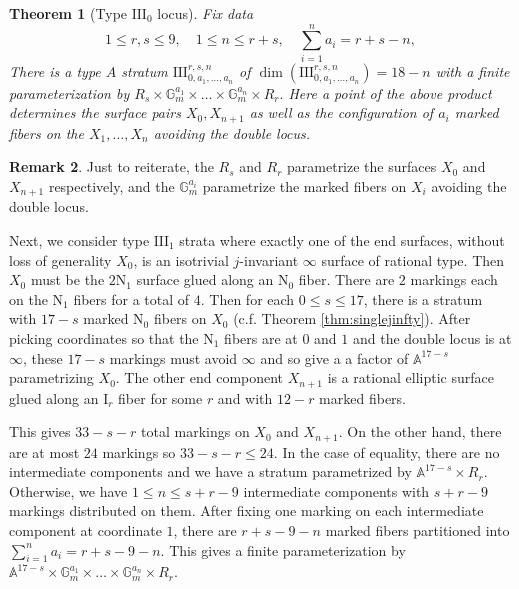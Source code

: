 \documentclass[11pt]{amsart}
\newtheorem{theorem}{Theorem}[section]
\theoremstyle{definition}
\newtheorem{remark}[theorem]{Remark}
\theoremstyle{remark}
\newcommand{\mb}[1]{\mathbb{#1}}
\begin{document}
	\begin{theorem}[Type $\mathrm{III}_0$ locus]\label{thm:type31} Fix data
		$$ 1 \le r,s \le 9, \quad 1 \le n  \le r + s, \quad \sum_{i = 1}^n a_i = r + s - n, $$
		There is a type $A$ stratum
		$
		\mathrm{III}^{r,s,n}_{0, a_1, \ldots, a_n} 
		$
		of  $\dim(\mathrm{III}^{r,s,n}_{0, a_1, \ldots, a_n}) = 18 - n$ with a finite parameterization by 
		$
		R_s \times \mb{G}_m^{a_1} \times \ldots \times \mb{G}_m^{a_n} \times R_r.
		$
		Here a point of the above product determines the surface pairs $X_0, X_{n +1}$ as well as the configuration of $a_i$ marked fibers on the $X_1, \ldots, X_n$ avoiding the double locus. \end{theorem}
	
	\begin{remark} Just to reiterate, the $R_s$ and $R_r$ parametrize the surfaces $X_0$ and $X_{n+1}$ respectively, and the $\mb{G}_m^{a_i}$ parametrize the marked fibers on $X_i$ avoiding the double locus. \end{remark}
	
	Next, we consider type $\mathrm{III}_1$ strata where exactly one of the end surfaces, without loss of generality $X_0$, is an isotrivial $j$-invariant $\infty$ surface of rational type. Then $X_0$ must be the $2\mathrm{N}_1$ surface glued along an $\mathrm{N}_0$ fiber. There are $2$ markings each on the $\mathrm{N}_1$ fibers for a total of $4$. Then for each $0 \le s \le 17$, there is a stratum with $17 - s$ marked $\mathrm{N}_0$ fibers on $X_0$ (c.f. Theorem \ref{thm:singlejinfty}). After picking coordinates so that the $\mathrm{N}_1$ fibers are at $0$ and $1$ and the double locus is at $\infty$, these $17-s$ markings must avoid $\infty$ and so give a a factor of $\mb{A}^{17-s}$ parametrizing $X_0$. The other end component $X_{n+1}$ is a rational elliptic surface glued along an $\mathrm{I}_r$ fiber for some $r$ and with $12-r$ marked fibers.
	
	This gives $33 - s - r$ total markings on $X_0$ and $X_{n+1}$. On the other hand, there are at most $24$ markings so
	$
	33 - s - r \le 24. 
	$
	In the case of equality, there are no intermediate components and we have a stratum parametrized by $\mb{A}^{17 - s} \times R_r$. Otherwise, we have 
	$
	1 \le n \le s + r - 9
	$
	intermediate components with $s + r - 9$ markings distributed on them. After fixing one marking on each intermediate component at coordinate $1$, there are $r + s - 9 - n$ marked fibers partitioned into 
	$
	\sum_{i = 1}^n a_i = r + s - 9 - n. 
	$
	This gives a finite parameterization by 
	$
	\mb{A}^{17 - s} \times \mb{G}_m^{a_1} \times \ldots \times \mb{G}_m^{a_n} \times R_r
	$.
	
\end{document}
